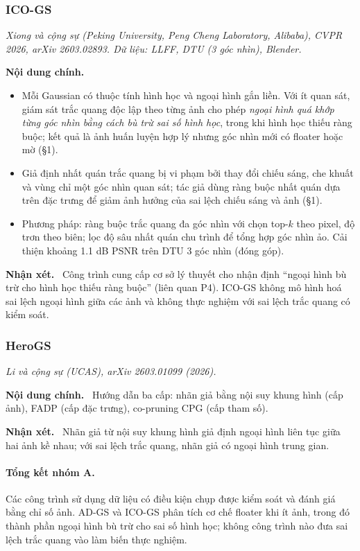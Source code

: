 \documentclass[11pt,a4paper]{article}
\newcommand{\papersays}{\par\smallskip\noindent\textbf{\color{paper}Nội dung chính.}~}
\newcommand{\wesay}{\par\smallskip\noindent\textbf{\color{nhom}Nhận xét.}~}
\newcommand{\info}[1]{\par\noindent\textit{#1}\par\smallskip}
\begin{document}
\subsubsection{ICO-GS~\cite{icogs}}
\info{Xiong và cộng sự (Peking University, Peng Cheng Laboratory, Alibaba), CVPR 2026, arXiv 2603.02893. Dữ liệu: LLFF, DTU (3 góc nhìn), Blender.}
\papersays
\begin{itemize}
  \item Mỗi Gaussian có thuộc tính hình học và ngoại hình gắn liền. Với ít quan sát, giám sát trắc quang độc lập theo từng ảnh cho phép \emph{ngoại hình quá khớp từng góc nhìn bằng cách bù trừ sai số hình học}, trong khi hình học thiếu ràng buộc; kết quả là ảnh huấn luyện hợp lý nhưng góc nhìn mới có floater hoặc mờ (§1).
  \item Giả định nhất quán trắc quang bị vi phạm bởi thay đổi chiếu sáng, che khuất và vùng chỉ một góc nhìn quan sát; tác giả dùng ràng buộc nhất quán dựa trên đặc trưng để giảm ảnh hưởng của sai lệch chiếu sáng và ảnh (§1).
  \item Phương pháp: ràng buộc trắc quang đa góc nhìn với chọn top-$k$ theo pixel, độ trơn theo biên; lọc độ sâu nhất quán chu trình để tổng hợp góc nhìn ảo. Cải thiện khoảng 1.1 dB PSNR trên DTU 3 góc nhìn (đóng góp).
\end{itemize}
\wesay
Công trình cung cấp cơ sở lý thuyết cho nhận định ``ngoại hình bù trừ cho hình học thiếu ràng buộc'' (liên quan P4). ICO-GS không mô hình hoá sai lệch ngoại hình giữa các ảnh và không thực nghiệm với sai lệch trắc quang có kiểm soát.

\subsubsection{HeroGS~\cite{herogs}}
\info{Li và cộng sự (UCAS), arXiv 2603.01099 (2026).}
\papersays
Hướng dẫn ba cấp: nhãn giả bằng nội suy khung hình (cấp ảnh), FADP (cấp đặc trưng), co-pruning CPG (cấp tham số).
\wesay
Nhãn giả từ nội suy khung hình giả định ngoại hình liên tục giữa hai ảnh kề nhau; với sai lệch trắc quang, nhãn giả có ngoại hình trung gian.

\paragraph{Tổng kết nhóm A.} Các công trình sử dụng dữ liệu có điều kiện chụp được kiểm soát và đánh giá bằng chỉ số ảnh. AD-GS và ICO-GS phân tích cơ chế floater khi ít ảnh, trong đó thành phần ngoại hình bù trừ cho sai số hình học; không công trình nào đưa sai lệch trắc quang vào làm biến thực nghiệm.
\end{document}
